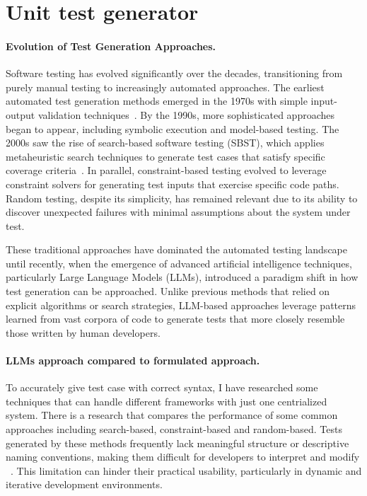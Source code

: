 \section{Unit test generator}

\paragraph{Evolution of Test Generation Approaches.} Software testing has evolved significantly over the decades, transitioning from purely manual testing to increasingly automated approaches. The earliest automated test generation methods emerged in the 1970s with simple input-output validation techniques~\cite{TestHistory}. By the 1990s, more sophisticated approaches began to appear, including symbolic execution and model-based testing. The 2000s saw the rise of search-based software testing (SBST), which applies metaheuristic search techniques to generate test cases that satisfy specific coverage criteria~\cite{SearchBasedSurvey}. In parallel, constraint-based testing evolved to leverage constraint solvers for generating test inputs that exercise specific code paths. Random testing, despite its simplicity, has remained relevant due to its ability to discover unexpected failures with minimal assumptions about the system under test.

\hspace{0.5cm} These traditional approaches have dominated the automated testing landscape until recently, when the emergence of advanced artificial intelligence techniques, particularly Large Language Models (LLMs), introduced a paradigm shift in how test generation can be approached. Unlike previous methods that relied on explicit algorithms or search strategies, LLM-based approaches leverage patterns learned from vast corpora of code to generate tests that more closely resemble those written by human developers.

\paragraph{LLMs approach compared to formulated approach.} To accurately give test case with correct syntax, I have researched some techniques that can handle different frameworks with just one centrialized system. There is a research that compares the performance of some common approaches including search-based, constraint-based and random-based. Tests generated by these methods frequently lack meaningful structure or descriptive naming conventions, making them difficult for developers to interpret and modify ~\cite{UnitTest}. This limitation can hinder their practical usability, particularly in dynamic and iterative development environments.

